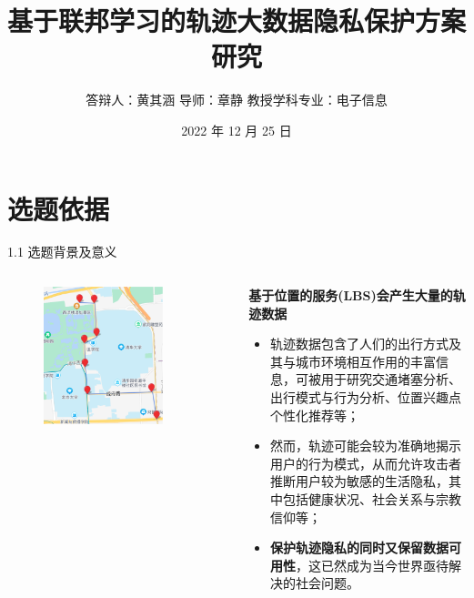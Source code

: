\documentclass{sintefbeamer}
\title{基于联邦学习的轨迹大数据隐私保护方案研究 }
\subtitle{答辩人：黄其涵 \qquad 导师：章静 教授\qquad 学科专业：电子信息 }
\date{2022 年 12 月 25 日}
\begin{document}
\maketitle

\section{选题依据}{}

\begin{frame}{1.1 选题背景及意义}{\thesection \, \secname}
\begin{columns}
\begin{column}{0.4\textwidth}
\begin{figure}[ht]
\centering
\includegraphics[width=0.8\textwidth]{images/real_traj}
\end{figure}
\end{column}
\begin{column}{0.6\textwidth}
\textbf{基于位置的服务(LBS)会产生大量的轨迹数据}
\begin{itemize}
	\item 轨迹数据包含了人们的出行方式及其与城市环境相互作用的丰富信息，可被用于研究交通堵塞分析、出行模式与行为分析、位置兴趣点个性化推荐等；
	\item 然而，轨迹可能会较为准确地揭示用户的行为模式，从而允许攻击者推断用户较为敏感的生活隐私，其中包括健康状况、社会关系与宗教信仰等；
	\item \textbf{\alert{保护轨迹隐私的同时又保留数据可用性}}，这已然成为当今世界亟待解决的社会问题。
\end{itemize}
\end{column}
\end{columns}
\end{frame}
\end{document}

